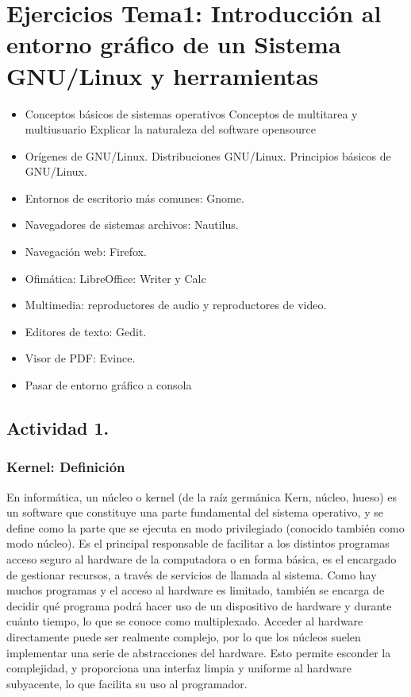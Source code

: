 \documentclass[a4paper,11pt,spanish]{article} %
\begin{document}
\newpage
{}
\setcounter{page}{1}


\section{Ejercicios Tema1: Introducción al entorno gráfico de un Sistema GNU/Linux y herramientas}

\begin{itemize}
 \item Conceptos básicos de sistemas operativos
  \subitem Conceptos de multitarea y multiusuario
  \subitem Explicar la naturaleza del software opensource
 \item Orígenes de GNU/Linux. Distribuciones GNU/Linux. Principios básicos de GNU/Linux.
 \item Entornos de escritorio más comunes: Gnome.
 \item Navegadores de sistemas archivos: Nautilus.
 \item Navegación web: Firefox.
 \item Ofimática: LibreOffice: Writer y Calc
 \item Multimedia: reproductores de audio y reproductores de video.
 \item Editores de texto: Gedit.
 \item Visor de PDF: Evince.
 \item Pasar de entorno gráfico a consola
\end{itemize}

\subsection{Actividad 1.}
\subsubsection{Kernel: Definición}

En informática, un núcleo o kernel (de la raíz germánica Kern, núcleo, hueso) es un software que 
constituye una parte fundamental del sistema operativo, y se define como la parte que se ejecuta en modo 
privilegiado (conocido también como modo núcleo). Es el principal responsable de facilitar a 
los distintos programas acceso seguro al hardware de la computadora o en forma básica, 
es el encargado de gestionar recursos, a través de servicios de llamada al sistema. 
Como hay muchos programas y el acceso al hardware es limitado, también se encarga de 
decidir qué programa podrá hacer uso de un dispositivo de hardware y durante cuánto tiempo, 
lo que se conoce como multiplexado. Acceder al hardware directamente puede ser realmente complejo, 
por lo que los núcleos suelen implementar una serie de abstracciones del hardware. Esto permite esconder 
la complejidad, y proporciona una interfaz limpia y uniforme al hardware subyacente, lo que facilita su uso 
al programador.
\end{document}
